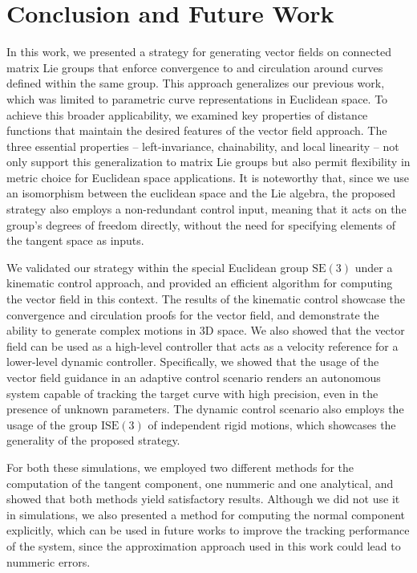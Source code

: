 \chapter{Conclusion and Future Work}\label{ch:conclusion}
In this work, we presented a strategy for generating vector fields on connected matrix Lie groups that enforce convergence to and circulation around curves defined within the same group. This approach generalizes our previous work, which was limited to parametric curve representations in Euclidean space. To achieve this broader applicability, we examined key properties of distance functions that maintain the desired features of the vector field approach. The three essential properties -- left-invariance, chainability, and local linearity -- not only support this generalization to matrix Lie groups but also permit flexibility in metric choice for Euclidean space applications. It is noteworthy that, since we use an isomorphism between the euclidean space and the Lie algebra, the proposed strategy also employs a non-redundant control input, meaning that it acts on the group's degrees of freedom directly, without the need for specifying elements of the tangent space as inputs.

We validated our strategy within the special Euclidean group $\text{SE}(3)$ under a kinematic control approach, and provided an efficient algorithm for computing the vector field in this context. The results of the kinematic control showcase the convergence and circulation proofs for the vector field, and demonstrate the ability to generate complex motions in 3D space. We also showed that the vector field can be used as a high-level controller that acts as a velocity reference for a lower-level dynamic controller. Specifically, we showed that the usage of the vector field guidance in an adaptive control scenario renders an autonomous system capable of tracking the target curve with high precision, even in the presence of unknown parameters. The dynamic control scenario also employs the usage of the group $\text{ISE}(3)$ of independent rigid motions, which showcases the generality of the proposed strategy.

For both these simulations, we employed two different methods for the computation of the tangent component, one nummeric and one analytical, and showed that both methods yield satisfactory results. Although we did not use it in simulations, we also presented a method for computing the normal component explicitly, which can be used in future works to improve the tracking performance of the system, since the approximation approach used in this work could lead to nummeric errors.

